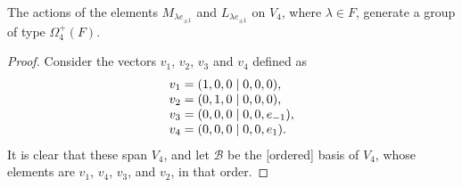 \begin{lemma}
	The actions of the elements $M_{\lambda e_{\pm 1}}$ and $L_{\lambda e_{\pm 1}}$
	on $V_4$, where $\lambda \in F$, generate a group of type $\Omega_4^+(F)$.
\end{lemma}

\begin{proof}
	Consider the vectors $v_1$, $v_2$, $v_3$ and $v_4$ defined as
	\begin{equation*}
		\begin{array}{r@{\;}c@{\;}l}
			v_1 & = & (1,0,0 \mid 0,0,0), \\
			v_2 & = & (0,1,0 \mid 0,0,0), \\
			v_3 & = & (0,0,0 \mid 0,0,e_{-1}), \\
			v_4 & = & (0,0,0 \mid 0,0,e_1).
		\end{array}
	\end{equation*}
	It is clear that these span $V_4$, and let $\mathcal{B}$ be 
	the [ordered] basis of $V_4$, whose
	elements are $v_1$, $v_4$, $v_3$, and $v_2$, in that order. 
	

\end{proof}
